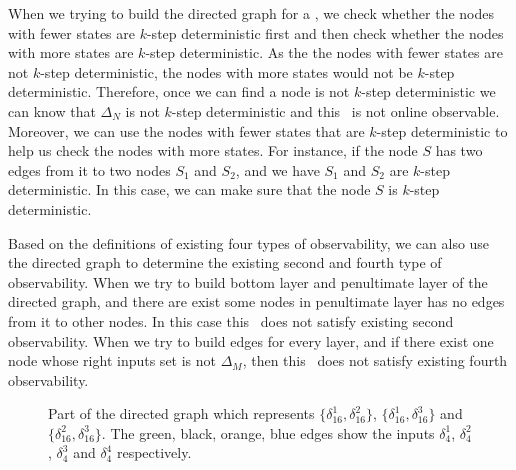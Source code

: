 When we trying to build the directed graph for a \BCN, we check whether the nodes with fewer states are $k$-step deterministic first and then check whether the nodes with more states are $k$-step deterministic.  As the the nodes with fewer states are not $k$-step deterministic, the nodes with more states would not be $k$-step deterministic. Therefore, once we can find a node is not $k$-step deterministic we can know that $\Delta_N$ is not $k$-step deterministic and this \BCN\ is not online observable. Moreover, we can use the nodes with fewer states that are $k$-step deterministic to help us check the nodes with more states. For instance, if the node $S$ has two edges from it to two nodes $S_1$ and $S_2$, and we have $S_1$ and $S_2$ are $k$-step deterministic. In this case, we can make sure that the node $S$ is $k$-step deterministic.

Based on the definitions of existing four types of observability, we can also use the directed graph to determine the existing second and fourth type of observability. When we try to build bottom layer and penultimate layer of the directed graph, and there are exist some nodes in penultimate layer has no edges from it to other nodes. In this case this \BCN\ does not satisfy existing second observability. When we try to build edges for every layer, and if there exist one node whose right inputs set is not $\Delta_M$, then this \BCN\ does not satisfy existing fourth observability.
\begin{figure}[thpb]
      \centering
      
      \caption{Part of the directed graph which represents $\{\delta_{16}^1,\delta_{16}^2\}$, $\{\delta_{16}^1,\delta_{16}^3\}$ and $\{\delta_{16}^2,\delta_{16}^3\}$. The green, black, orange, blue edges show the inputs $\delta_4^1$, $\delta_4^2$, $\delta_4^3$ and $\delta_4^4$ respectively.}
      \label{fig:4}
   \end{figure}
